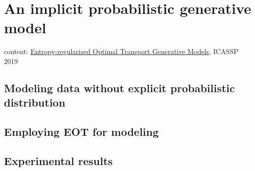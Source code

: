 \chapter{An implicit probabilistic generative model}
content: \href{https://ieeexplore.ieee.org/stamp/stamp.jsp?arnumber=8682721}{Entropy-regularized Optimal Transport Generative Models}, ICASSP 2019


\section{Modeling data without explicit probabilistic distribution}

\section{Employing EOT for modeling}

\section{Experimental results}


